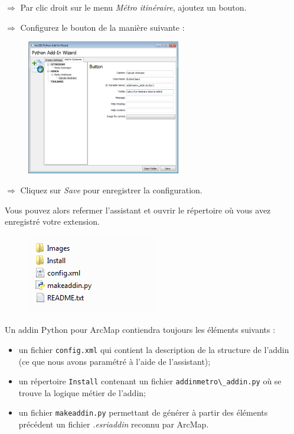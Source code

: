 \documentclass[11pt]{article}
\newcommand{\action}{$\Rightarrow$ }
\newcommand{\code}[1]{\lstinline{#1}}
\begin{document}
\action Par clic droit sur le menu \textit{Métro itinéraire}, ajoutez un bouton.

\action Configurez le bouton de la manière suivante :
\begin{figure}[H]
	\center \includegraphics[width=0.6\textwidth]{img/td3/addin_assistant-4.png} \\
\end{figure}

\action Cliquez sur \textit{Save} pour enregistrer la configuration.

Vous pouvez alors refermer l'assistant et ouvrir le répertoire où vous avez enregistré votre extension.
\begin{figure}[H]
	\center \includegraphics{img/td3/addin_repertoire.png} \\
\end{figure}

Un addin Python pour ArcMap contiendra toujours les éléments suivants :
\begin{itemize}
	\item un fichier \code{config.xml} qui contient la description de la structure de l'addin (ce que nous avons paramétré à l'aide de l'assistant);
	\item un répertoire \code{Install} contenant un fichier \code{addinmetro\_addin.py} où se trouve la logique métier de l'addin;
	\item un fichier \code{makeaddin.py} permettant de générer à partir des éléments précédent un fichier \textit{.esriaddin} reconnu par ArcMap.
\end{itemize}
\end{document}
